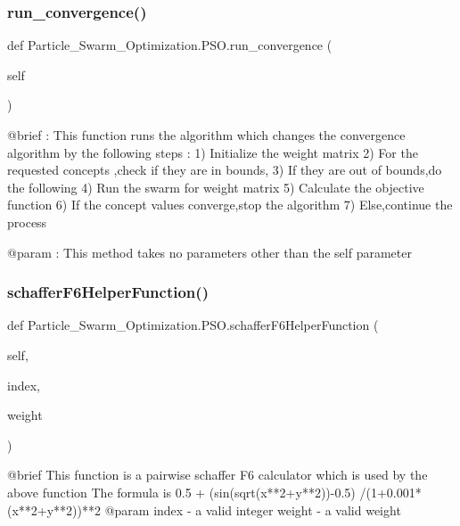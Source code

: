 \subsubsection{\texorpdfstring{run\+\_\+convergence()}{run\_convergence()}}
{\footnotesize\ttfamily def Particle\+\_\+\+Swarm\+\_\+\+Optimization.\+P\+S\+O.\+run\+\_\+convergence (\begin{DoxyParamCaption}\item[{}]{self }\end{DoxyParamCaption})}

\begin{DoxyVerb}@brief : This function runs the algorithm which changes the convergence
         algorithm by the following steps :
         1) Initialize the weight matrix
         2) For the requested concepts ,check if they are in bounds,
         3) If they are out of bounds,do the following
         4) Run the swarm for weight matrix
         5) Calculate the objective function
         6) If the concept values converge,stop the algorithm
         7) Else,continue the process

@param  : This method takes no parameters other than the self parameter\end{DoxyVerb}
 \hypertarget{class_particle___swarm___optimization_1_1_p_s_o_a950b777176b42eb5b488c1b822cd0275}{}\label{class_particle___swarm___optimization_1_1_p_s_o_a950b777176b42eb5b488c1b822cd0275} 
\subsubsection{\texorpdfstring{schaffer\+F6\+Helper\+Function()}{schafferF6HelperFunction()}}
{\footnotesize\ttfamily def Particle\+\_\+\+Swarm\+\_\+\+Optimization.\+P\+S\+O.\+schaffer\+F6\+Helper\+Function (\begin{DoxyParamCaption}\item[{}]{self,  }\item[{}]{index,  }\item[{}]{weight }\end{DoxyParamCaption})}

\begin{DoxyVerb}@brief  This function is a pairwise schaffer F6 calculator which is used by the above function
    The formula is 0.5 + (sin(sqrt(x**2+y**2))-0.5) /(1+0.001*(x**2+y**2))**2
@param index - a valid integer
   weight - a valid weight\end{DoxyVerb}
 \hypertarget{class_particle___swarm___optimization_1_1_p_s_o_a8cfda07a7b320a55112993aea3a1f921}{}\label{class_particle___swarm___optimization_1_1_p_s_o_a8cfda07a7b320a55112993aea3a1f921} 
